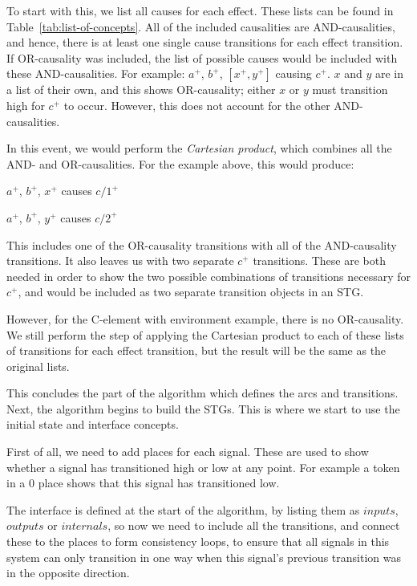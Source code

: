 \documentclass[british,conference,compsoc]{IEEEtran}
\begin{document}
To start with this, we list all causes for each effect. These lists can be found in
Table~\ref{tab:list-of-concepts}.
All of the included causalities are AND-causalities, and hence, there
is at least one single cause transitions for each effect transition. If 
OR-causality was included, the list of possible causes would be included with these
AND-causalities. For example:  $a^{+}$, $b^{+}$, $[x^{+}, y^{+}]$ causing
$c^{+}$. $x$ and $y$ are in a list of their own, and this shows OR-causality;
either $x$ or $y$ must transition high for $c^{+}$ to occur. However, this does
not account for the other AND-causalities. 

In this event, we would perform the \emph{Cartesian product}, which combines
all the AND- and OR-causalities. For the example above, this would produce:

\vspace{-2mm}

\begin{center}

$a^{+}$, $b^{+}$, $x^{+}$ causes $c/1^{+}$

$a^{+}$, $b^{+}$, $y^{+}$ causes $c/2^{+}$

\end{center}

\vspace{-2mm}

\noindent This includes one of the OR-causality transitions with all of the 
AND-causality transitions. It also leaves us with two separate $c^{+}$ 
transitions. These are both needed in order to show the two possible 
combinations of transitions necessary for $c^{+}$, and would be included as two
separate transition objects in an STG. 

However, for the C-element with environment example, there is no OR-causality. 
We still perform the step of applying the Cartesian product to each of these 
lists of transitions for each effect transition, but the result will be the 
same as the original lists.

This concludes the part of the algorithm which defines the arcs
and transitions. Next, the algorithm begins to build the STGs. This is where
we start to use the initial state and interface concepts. 

First of all, we need to add places for each signal. These are used to
show whether a signal has transitioned high or low at any point. 
For example a token in a $0$ place shows that this signal has 
transitioned low. 

The interface is defined at the start of the algorithm, by listing them as 
$inputs$, $outputs$ or $internals$, so now we need to include all the 
transitions, and connect these to the places to form consistency loops, to 
ensure that all signals in this system can only transition in one way when this 
signal's previous transition was in the opposite direction. 
\end{document}
